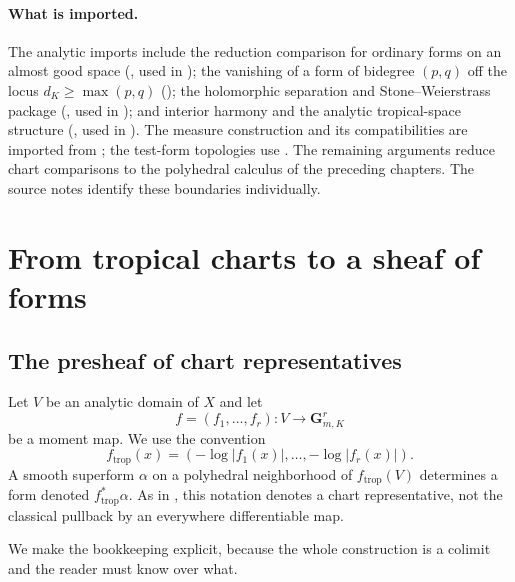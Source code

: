 \paragraph{What is imported.}
The analytic imports include the reduction comparison for ordinary forms
on an almost good space
(\cite[Proposition~15.1.3]{CLD25}, used in
); the vanishing of a form of bidegree
$(p,q)$ off the locus $d_K\ge\max(p,q)$
(\cite[Proposition~15.2.1]{CLD25}); the holomorphic separation and
Stone--Weierstrass package
(\cite[Corollary~15.2.5, Theorem~15.2.6, Proposition~15.2.8]{CLD25}, used in
); and interior harmony and the analytic
tropical-space structure
(\cite[Theorems~15.6.1 and~15.7.1]{CLD25}, used in
).  The measure construction and its
compatibilities are imported from \cite[\S\S5.8, 15.3--15.4]{CLD25};
the test-form topologies use \cite[\S\S3.6--3.7, 6.4]{CLD25}.
The remaining arguments reduce chart comparisons to the polyhedral
calculus of the preceding chapters.  The source notes identify these
boundaries individually.

\section{From tropical charts to a sheaf of forms}
\label{sec:ch13-charts}

\subsection{The presheaf of chart representatives}
\label{sec:ch13-presheaf}

Let $V$ be an analytic domain of $X$ and let
\[
             f=(f_1,\ldots,f_r):V\longrightarrow\mathbf G_{m,K}^r
\]
be a moment map.  We use the convention
\[
 f_{\mathrm{trop}}(x)=(-\log|f_1(x)|,\ldots,-\log|f_r(x)|).
\]
A smooth superform $\alpha$ on a polyhedral neighborhood of
$f_{\mathrm{trop}}(V)$ determines a form denoted
$f_{\mathrm{trop}}^*\alpha$.  As in ,
this notation denotes a chart representative, not the classical pullback by
an everywhere differentiable map.

We make the bookkeeping explicit, because the whole construction is a
colimit and the reader must know over what.

